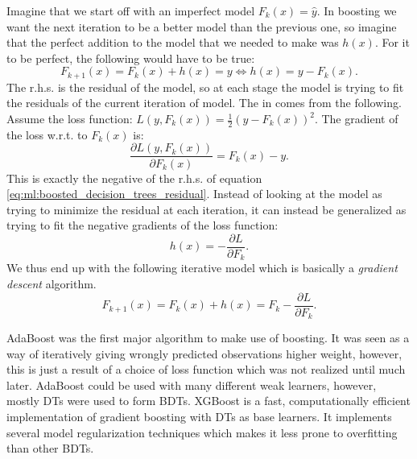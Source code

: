 Imagine that we start off with an imperfect model $F_k(x)=\hat{y}$. In boosting we want the next iteration to be a better model than the previous one, so imagine that the perfect addition to the model that we needed to make was $h(x)$. For it to be perfect, the following would have to be true:
\begin{equation}
  \label{eq:ml:boosted_decision_trees_residual}
  F_{k+1}(x) = F_k(x) + h(x) = y \Leftrightarrow h(x) = y - F_k(x).
\end{equation}
The r.h.s. is the residual of the model, so at each stage the model is trying to fit the residuals of the current iteration of model. The  in  comes from the following. Assume the loss function: $L(y, F_k(x)) = \frac{1}{2}  (y-F_k(x))^2$. The gradient of the loss w.r.t. to $F_k(x)$ is:
\begin{equation}
  \frac{\partial L(y, F_k(x))}{\partial F_k(x)} = F_k(x) - y. 
\end{equation}
This is exactly the negative of the r.h.s. of equation \eqref{eq:ml:boosted_decision_trees_residual}. Instead of looking at the model as trying to minimize the residual at each iteration, it can instead be generalized as trying to fit the negative gradients of the loss function:
\begin{equation}
  h(x) = - \frac{\partial L}{\partial F_k}.
\end{equation}
We thus end up with the following iterative model which is basically a \emph{gradient descent} algorithm.
\begin{equation}
  F_{k+1}(x) = F_k(x) + h(x) = F_k - \frac{\partial L}{\partial F_k}.
\end{equation}


AdaBoost \autocite{freundDesiciontheoreticGeneralizationOnline1995} was the first major algorithm to make use of boosting. It was seen as a way of iteratively giving wrongly predicted observations higher weight, however, this is just a result of a  choice of loss function which was not realized until much later. AdaBoost could be used with many different weak learners, however, mostly DTs were used to form BDTs. XGBoost \autocite{chenXGBoostScalableTree2016} is a fast, computationally efficient implementation of gradient boosting with DTs as base learners. It implements several model regularization techniques which makes it less prone to overfitting than other BDTs. 

